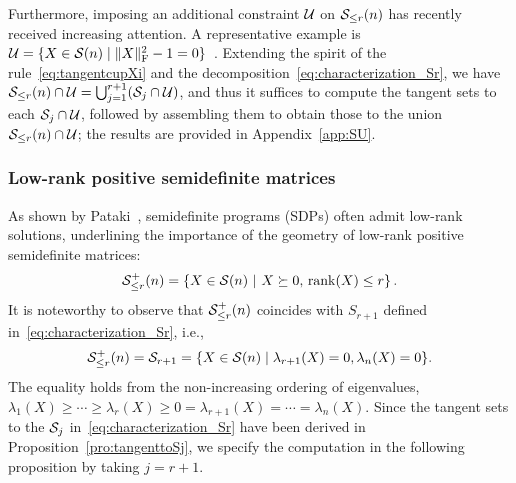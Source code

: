 \smallskip

Furthermore, imposing an additional constraint $\mathcal{U}$ on $\mathcal{S}_{\le r}(n)$ has recently received increasing attention. A representative example is $\mathcal{U}=\{X\in\mathcal{S}(n)\mid \|X\|_{\mathrm{F}}^2-1=0\}$~\cite{cason2013iterative,li2020jotaspectral}. Extending the spirit of the rule~\eqref{eq:tangentcupXi} and the decomposition~\eqref{eq:characterization_Sr}, we have $\mathcal{S}_{\le r}(n)\cap\mathcal{U}=\bigcup_{j=1}^{r+1} (\mathcal{S}_j\cap\mathcal{U})$, and thus it suffices to compute the tangent sets to each $\mathcal{S}_j\cap\mathcal{U}$, followed by assembling them to obtain those to the union $\mathcal{S}_{\le r}(n)\cap\mathcal{U}$; the results are provided in Appendix~\ref{app:SU}.




\subsubsection{Low-rank positive semidefinite matrices}\label{sec:lowrank_posi}
As shown by Pataki~\cite{pataki1998lowranksolution}, semidefinite programs (SDPs) often admit low-rank solutions, underlining the importance of the geometry of low-rank positive semidefinite matrices:
\begin{equation}\label{eq:boundedranksdp}
    \mathcal{S}^+_{\le r}(n) = \left\{ {X \in \mathcal{S}(n)\ |\  X\succeq 0,\,\operatorname{rank}(X) \leq r} \right\}.
\end{equation}
It is noteworthy to observe that $\mathcal{S}^+_{\le r}(n)$ coincides with $S_{r+1}$ defined in~\eqref{eq:characterization_Sr}, i.e.,
\begin{equation}\label{eq:characterization_S+r}
    \mathcal{S}^+_{\le r}(n)=\mathcal{S}_{r+1}=\{X\in\mathcal{S}(n)\mid\lambda_{r+1}(X)=0,\lambda_n(X)=0\}.
\end{equation}
The equality holds from the non-increasing ordering of eigenvalues, $\lambda_1(X)\ge\cdots\ge\lambda_r(X)\ge 0 = \lambda_{r+1}(X)=\cdots=\lambda_n(X)$. Since the tangent sets to the $\mathcal{S}_j$ in~\eqref{eq:characterization_Sr} have been derived in Proposition~\ref{pro:tangenttoSj}, we specify the computation in the following proposition by taking $j=r+1$.

